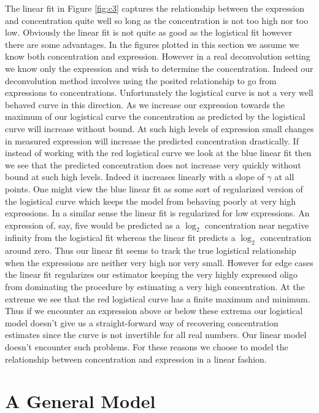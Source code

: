 \documentclass[reqno,12pt,oneside]{report}\usepackage[]{graphicx}\usepackage[]{color}
\theoremstyle{plain}
\theoremstyle{definition}
\theoremstyle{remark}
\numberwithin{theorem}{chapter}     %
\begin{document}
The linear fit in Figure \ref{fig:c3} captures the relationship between the expression and concentration quite well so long as the concentration is not too high nor too low. Obviously the linear fit is not quite as good as the logistical fit however there are some advantages. In the figures plotted in this section we assume we know both concentration and expression. However in a real deconvolution setting we know only the expression and wish to determine the concentration. Indeed our deconvolution method involves using the posited relationship to go from expressions to concentrations. Unfortunately the logistical curve is not a very well behaved curve in this direction. As we increase our expression towards the maximum of our logistical curve the concentration as predicted by the logistical curve will increase without bound. At such high levels of expression small changes in measured expression will increase the predicted concentration drastically. If instead of working with the red logistical curve we look at the blue linear fit then we see that the predicted concentration does not increase very quickly without bound at such high levels. Indeed it increases linearly with a slope of $\gamma$ at all points. One might view the blue linear fit as some sort of regularized version of the logistical curve which keeps the model from behaving poorly at very high expressions. In a similar sense the linear fit is regularized for low expressions. An expression of, say, five would be predicted as a $\log_2$ concentration near negative infinity from the logistical fit whereas the linear fit predicts a $\log_2$ concentration around zero. Thus our linear fit seems to track the true logistical relationship when the expressions are neither very high nor very small. However for edge cases the linear fit regularizes our estimator keeping the very highly expressed oligo from dominating the procedure by estimating a very high concentration. At the extreme we see that the red logistical curve has a finite maximum and minimum. Thus if we encounter an expression above or below these extrema our logistical model doesn't give us a straight-forward way of recovering concentration estimates since the curve is not invertible for all real numbers. Our linear model doesn't encounter such problems. For these reasons we choose to model the relationship between concentration and expression in a linear fashion. 
  
\section{A General Model}
\end{document}

